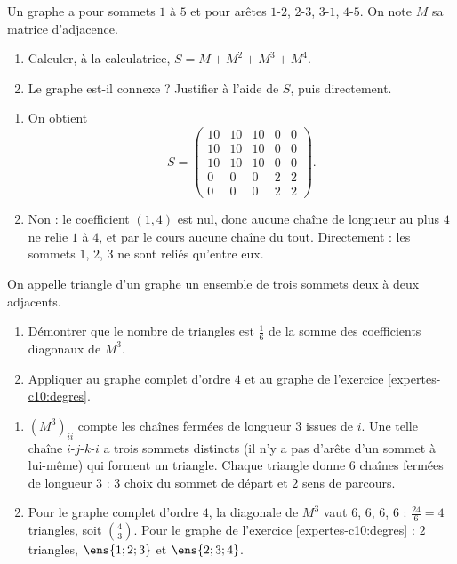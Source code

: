 \begin{exercise}
Un graphe a pour sommets $1$ à $5$ et pour arêtes $1$-$2$, $2$-$3$, $3$-$1$, $4$-$5$. On note $M$ sa matrice d'adjacence.
\begin{enumerate}
\item Calculer, à la calculatrice, $S=M+M^2+M^3+M^4$.
\item Le graphe est-il connexe ? Justifier à l'aide de $S$, puis directement.
\end{enumerate}
\end{exercise}
\begin{solution}
\begin{enumerate}
\item On obtient \[S=\begin{pmatrix}10&10&10&0&0\\10&10&10&0&0\\10&10&10&0&0\\0&0&0&2&2\\0&0&0&2&2\end{pmatrix}.\]
\item Non : le coefficient $(1,4)$ est nul, donc aucune chaîne de longueur au plus $4$ ne relie $1$ à $4$, et par le cours aucune chaîne du tout. Directement : les sommets $1$, $2$, $3$ ne sont reliés qu'entre eux.
\end{enumerate}
\end{solution}

\begin{exercise}
On appelle triangle d'un graphe un ensemble de trois sommets deux à deux adjacents.
\begin{enumerate}
\item Démontrer que le nombre de triangles est $\frac16$ de la somme des coefficients diagonaux de $M^3$.
\item Appliquer au graphe complet d'ordre $4$ et au graphe de l'exercice \ref{expertes-c10:degres}.
\end{enumerate}
\end{exercise}
\begin{solution}
\begin{enumerate}
\item $\left(M^3\right)_{ii}$ compte les chaînes fermées de longueur $3$ issues de $i$. Une telle chaîne $i$-$j$-$k$-$i$ a trois sommets distincts (il n'y a pas d'arête d'un sommet à lui-même) qui forment un triangle. Chaque triangle donne $6$ chaînes fermées de longueur $3$ : $3$ choix du sommet de départ et $2$ sens de parcours.
\item Pour le graphe complet d'ordre $4$, la diagonale de $M^3$ vaut $6$, $6$, $6$, $6$ : $\frac{24}6=4$ triangles, soit $\binom43$. Pour le graphe de l'exercice \ref{expertes-c10:degres} : $2$ triangles, $\ens{1;2;3}$ et $\ens{2;3;4}$.
\end{enumerate}
\end{solution}

